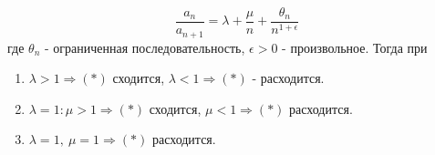 \begin{examples}
\begin{enumerate}
        \[\frac{a_n}{a_{n+1}}=\lambda+\frac{\mu}{n}+\frac{\theta_n}{n^{1+\epsilon}}\]
        где $\theta_n$ - ограниченная последовательность, $\epsilon>0$ - произвольное. Тогда при
        \begin{enumerate}
            \item $\lambda>1 \Rightarrow (*)$ сходится, $\lambda<1 \Rightarrow (*)$ - расходится.
            \item $\lambda=1: \mu>1 \Rightarrow (*)$ сходится, $\mu<1 \Rightarrow (*)$ расходится.
            \item $\lambda=1,\ \mu=1 \Rightarrow (*)$ расходится.  
        \end{enumerate}
    \end{enumerate}
\end{examples}
